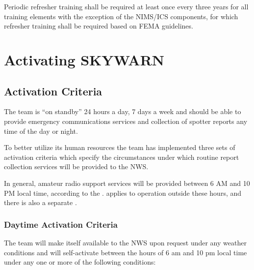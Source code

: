 \documentclass[pdflatex,letterpaper,twoside,12pt]{book}
\begin{document}
Periodic refresher training shall be required at least once every three years for all training elements with the exception of the NIMS/ICS components, for which refresher training shall be required based on FEMA guidelines.


\chapter{Activating SKYWARN}\label{activating-skywarn}


\section{Activation Criteria}\label{activation-criteria}

The team is ``on standby'' 24 hours a day, 7 days a week and should be able to provide emergency communications services and collection of spotter reports any time of the day or night.

To better utilize its human resources the team has implemented three sets of activation criteria which specify the circumstances under which routine report collection services will be provided to the NWS.

In general, amateur radio support services will be provided between 6 AM and 10 PM local time, according to the .   applies to operation outside these hours, and there is also a separate .

\subsection{Daytime Activation Criteria}\label{daytime-criteria}

The team will make itself available to the NWS upon request under any weather conditions and will self-activate between the hours of 6 am and 10 pm local time under any one or more of the following conditions:
\end{document}
